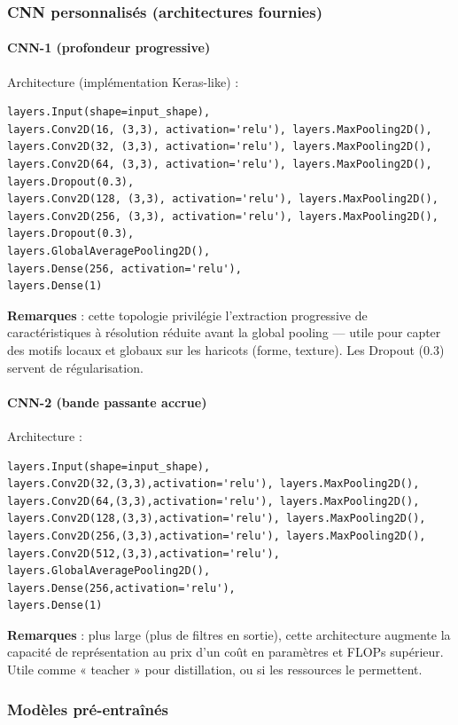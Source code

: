 \subsubsection{CNN personnalisés (architectures fournies)}

\paragraph{CNN-1 (profondeur progressive)}  
Architecture (implémentation Keras-like) :
\begin{verbatim}
layers.Input(shape=input_shape),
layers.Conv2D(16, (3,3), activation='relu'), layers.MaxPooling2D(),
layers.Conv2D(32, (3,3), activation='relu'), layers.MaxPooling2D(),
layers.Conv2D(64, (3,3), activation='relu'), layers.MaxPooling2D(),
layers.Dropout(0.3),
layers.Conv2D(128, (3,3), activation='relu'), layers.MaxPooling2D(),
layers.Conv2D(256, (3,3), activation='relu'), layers.MaxPooling2D(),
layers.Dropout(0.3),
layers.GlobalAveragePooling2D(),
layers.Dense(256, activation='relu'),
layers.Dense(1)
\end{verbatim}

\noindent \textbf{Remarques} : cette topologie privilégie l’extraction progressive de caractéristiques à résolution réduite avant la global pooling — utile pour capter des motifs locaux et globaux sur les haricots (forme, texture). Les Dropout (0.3) servent de régularisation.

\paragraph{CNN-2 (bande passante accrue)}  
Architecture :
\begin{verbatim}
layers.Input(shape=input_shape),
layers.Conv2D(32,(3,3),activation='relu'), layers.MaxPooling2D(),
layers.Conv2D(64,(3,3),activation='relu'), layers.MaxPooling2D(),
layers.Conv2D(128,(3,3),activation='relu'), layers.MaxPooling2D(),
layers.Conv2D(256,(3,3),activation='relu'), layers.MaxPooling2D(),
layers.Conv2D(512,(3,3),activation='relu'),
layers.GlobalAveragePooling2D(),
layers.Dense(256,activation='relu'),
layers.Dense(1)
\end{verbatim}

\noindent \textbf{Remarques} : plus large (plus de filtres en sortie), cette architecture augmente la capacité de représentation au prix d'un coût en paramètres et FLOPs supérieur. Utile comme « teacher » pour distillation, ou si les ressources le permettent.

\subsubsection{Modèles pré-entraînés}

